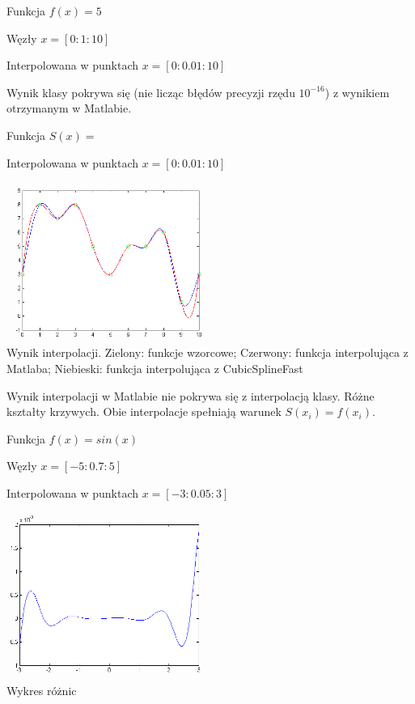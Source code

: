 \documentclass[12pt,a4paper,notitlepage]{article}
\begin{document}
\begin{description}
Funkcja $f(x) = 5$

Węzły $x = [0:1:10]$

Interpolowana w punktach $x = [0:0.01:10]$

Wynik klasy pokrywa się (nie licząc błędów precyzji rzędu $10^{-16}$) z wynikiem otrzymanym w Matlabie.

Funkcja $S(x) = $


Interpolowana w punktach $x = [0:0.01:10]$

\begin{center}
\includegraphics[width=0.5\textwidth]{spline2.png}\\
Wynik interpolacji. Zielony: funkcje wzorcowe; Czerwony: funkcja interpolująca z Matlaba; Niebieski: funkcja interpolująca z CubicSplineFast
\end{center}
	
Wynik interpolacji w Matlabie nie pokrywa się z interpolacją klasy. Różne kształty krzywych. Obie interpolacje spełniają warunek $S(x_i) = f(x_i)$.

Funkcja $f(x) = sin(x)$

Węzły $x = [-5:0.7:5]$

Interpolowana w punktach $x = [-3:0.05:3]$

\begin{center}
\includegraphics[width=0.5\textwidth]{spline3.png}\\
Wykres różnic
\end{center}


\end{description}
\end{document}
